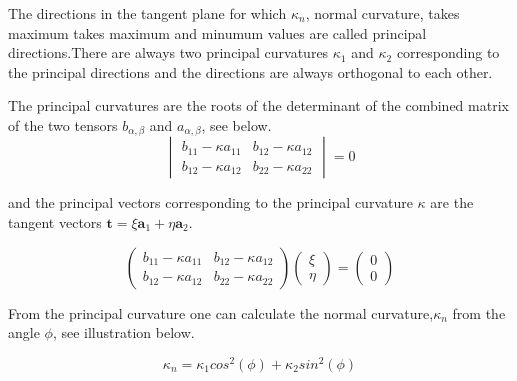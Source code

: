 The directions in the tangent plane for which $\kappa_n$, normal curvature, takes maximum takes maximum and minumum values are called principal directions.There are always two principal curvatures $\kappa_1$ and $\kappa_2$ corresponding to the principal directions and the directions are always orthogonal to each other. \cite{ref:Struik}  

The principal curvatures are the roots of the determinant of the combined matrix of the two tensors $b_{\alpha, \beta}$ and $a_{\alpha,\beta}$, see below. \cite{ref:Pressley}
\begin{equation}
  \begin{vmatrix} 
b_{11} - \kappa a_{11} & b_{12} - \kappa a_{12} \\ 
b_{12} - \kappa a_{12} & b_{22} - \kappa a_{22}
\end{vmatrix}
=0
\end{equation}

and the principal vectors corresponding to the principal curvature $\kappa$ are the tangent vectors $\textbf{t} = \xi \textbf{a}_1 + \eta \textbf{a}_2$. \cite{ref:Pressley}

\begin{equation}
\begin{pmatrix} 
b_{11} - \kappa a_{11} & b_{12} - \kappa a_{12} \\ 
b_{12} - \kappa a_{12} & b_{22} - \kappa a_{22}
\end{pmatrix}
\begin{pmatrix}
\xi \\
\eta
\end{pmatrix}
=
\begin{pmatrix}
0 \\
0
\end{pmatrix}
\end{equation}

From the principal curvature one can calculate the normal curvature,$\kappa_n$ from the angle $\phi$, see illustration below.\cite{ref:ArchGeometry} 

\begin{equation}
\kappa_n = \kappa_1cos^2(\phi) + \kappa_2sin^2(\phi) 
\end{equation}


